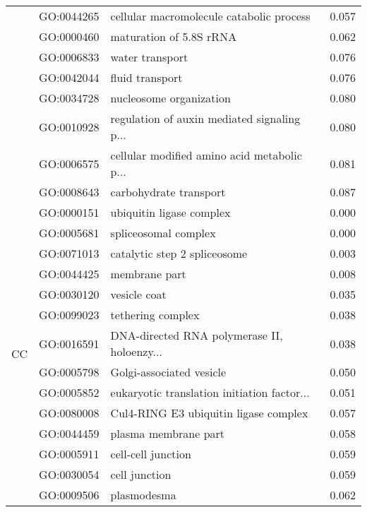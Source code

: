 \begin{longtable}{lllr}
   & GO:0044265 &     cellular macromolecule catabolic process &         0.057 \\
   & GO:0000460 &                      maturation of 5.8S rRNA &         0.062 \\
   & GO:0006833 &                              water transport &         0.076 \\
   & GO:0042044 &                              fluid transport &         0.076 \\
   & GO:0034728 &                      nucleosome organization &         0.080 \\
   & GO:0010928 &  regulation of auxin mediated signaling p... &         0.080 \\
   & GO:0006575 &  cellular modified amino acid metabolic p... &         0.081 \\
   & GO:0008643 &                       carbohydrate transport &         0.087 \\
\cline{1-4}
\multirow{21}{*}{CC} & GO:0000151 &                     ubiquitin ligase complex &         0.000 \\
   & GO:0005681 &                         spliceosomal complex &         0.000 \\
   & GO:0071013 &                 catalytic step 2 spliceosome &         0.003 \\
   & GO:0044425 &                                membrane part &         0.008 \\
   & GO:0030120 &                                 vesicle coat &         0.035 \\
   & GO:0099023 &                            tethering complex &         0.038 \\
   & GO:0016591 &  DNA-directed RNA polymerase II, holoenzy... &         0.038 \\
   & GO:0005798 &                     Golgi-associated vesicle &         0.050 \\
   & GO:0005852 &  eukaryotic translation initiation factor... &         0.051 \\
   & GO:0080008 &        Cul4-RING E3 ubiquitin ligase complex &         0.057 \\
   & GO:0044459 &                         plasma membrane part &         0.058 \\
   & GO:0005911 &                           cell-cell junction &         0.059 \\
   & GO:0030054 &                                cell junction &         0.059 \\
   & GO:0009506 &                                  plasmodesma &         0.062 \\

\end{longtable}
